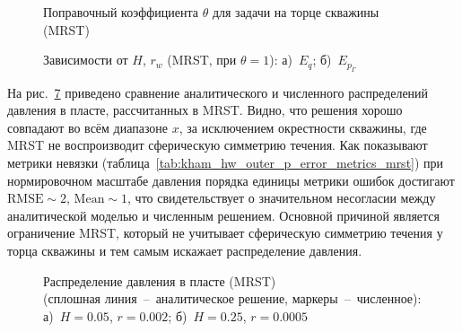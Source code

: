 \documentclass{article}
\begin{document}
\begin{figure}[H]
	\centering
	
	\caption{Поправочный коэффициента $\theta$ для задачи на торце скважины (MRST)}
	\label{fig:kham_hw_outer_theta_map_mrst}
\end{figure}

\begin{figure}[H]
	\centering
	\begin{subfigure}{0.48\textwidth}
		\centering
		
		\caption{}
		\label{fig:kham_hw_outer_eq_map_mrst}
	\end{subfigure}
	\hfill
	\begin{subfigure}{0.48\textwidth}
		\centering
		
		\caption{}
		\label{fig:kham_hw_outer_epg_map_mrst}
	\end{subfigure}
	\caption{
		Зависимости от $H$, $r_w$ (MRST, при $\theta = 1$):
		а)~$E_q$;
		б)~$E_{p_{\Gamma}}$
	}
	\label{fig:kham_hw_outer_eq_epg_maps_mrst}
\end{figure}

На рис.~\ref{fig:kham_hw_outer_press_disrt_mrst} приведено сравнение аналитического
и численного распределений давления в пласте, рассчитанных в MRST. Видно, что решения
хорошо совпадают во всём диапазоне $x$, за исключением окрестности скважины, где MRST
не воспроизводит сферическую симметрию течения. Как показывают метрики невязки
(таблица~\ref{tab:kham_hw_outer_p_error_metrics_mrst})
при нормировочном масштабе давления порядка единицы метрики ошибок достигают
$\text{RMSE} \sim 2$, $\text{Mean} \sim 1$, что свидетельствует о значительном
несогласии между аналитической моделью и численным решением. Основной причиной
является ограничение MRST, который не учитывает сферическую симметрию течения
у торца скважины и тем самым искажает распределение давления.

\begin{figure}[H]
	\centering
	\begin{subfigure}{0.48\textwidth}
		\centering
		
		\caption{}
		\label{fig:kham_hw_outer_p_worst_pg_mrst}
	\end{subfigure}
	\hfill
	\begin{subfigure}{0.48\textwidth}
		\centering
		
		\caption{}
		\label{fig:kham_hw_outer_p_best_pg_mrst}
	\end{subfigure}
	\caption{
		Распределение давления в пласте (MRST) \\
		(сплошная линия~--~аналитическое решение, маркеры~--~численное): \\
		а)~$H = 0.05$, $r = 0.002$;
		б)~$H = 0.25$, $r = 0.0005$
	}
	\label{fig:kham_hw_outer_press_disrt_mrst}
\end{figure}
\end{document}

